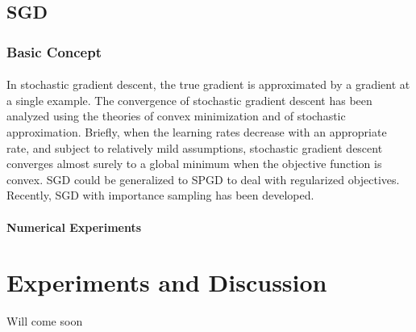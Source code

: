 \documentclass[
10pt, %
a4paper, %
oneside, %
headinclude,footinclude, %
BCOR5mm, %
]{scrartcl}
\begin{document}

\subsection{SGD}

\subsubsection{Basic Concept}
\paragraph{}
In stochastic gradient descent, the true gradient is approximated by a 
gradient at a single example. The convergence of stochastic gradient descent 
has been analyzed using the theories of convex minimization and of stochastic 
approximation. Briefly, when the learning rates decrease with an appropriate 
rate, and subject to relatively mild assumptions, stochastic gradient descent 
converges almost surely to a global minimum when the objective function is 
convex. SGD could be generalized to SPGD \cite{nitanda2014stochastic} to deal 
with regularized objectives. Recently, SGD with importance sampling 
\cite{zhao2014stochastic} has been developed. 

\paragraph{Numerical Experiments} 



\section{Experiments and Discussion}
Will come soon






%
%
\end{document}
